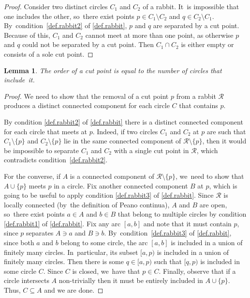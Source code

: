 \documentclass[JEP,XML,SOM,Unicode,NoFloatCountersInSection,published]{cedram}
\theoremstyle{plain}
\newtheorem{lemma}[theorem]{Lemma}
\theoremstyle{definition}
\theoremstyle{remark}
\newcommand{\R}{\mathcal{R}}
\begin{document}
\begin{proof}
Consider two distinct circles $C_1$ and $C_2$ of a rabbit. It~is impossible that one includes the other, so~there exist points $p \in C_1 \setminus C_2$ and $q \in C_2 \setminus C_1$. By~condition~\cref{def.rabbit2} of \cref{def.rabbit}, $p$ and $q$ are separated by a cut point.
Because of this, $C_1$ and $C_2$ cannot meet at more than one point, as otherwise $p$ and $q$ could not be separated by a cut point.
Then $C_1 \cap C_2$ is either empty or consists of a sole cut point.
\end{proof}

\begin{lemma}
\label{lem.cut.points.order}
The order of a cut point is equal to the number of circles that include~it.
\end{lemma}

\begin{proof}
We need to show that the removal of a cut point $p$ from a rabbit $\R$ produces a distinct connected component for each circle $C$ that contains $p$.

By condition \cref{def.rabbit2} of \cref{def.rabbit} there is a distinct connected component for each circle that meets at $p$.
Indeed, if two circles $C_1$ and $C_2$ at $p$ are such that $C_1 \setminus \{p\}$ and $C_2 \setminus \{p\}$ lie in the same connected component of $\R \setminus \{p\}$, then it would be impossible to separate $C_1$ and $C_2$ with a single cut point in $\R$, which contradicts condition~\cref{def.rabbit2}.

For the converse, if $A$ is a connected component of $\R \setminus \{p\}$, we~need to show that $A \cup \{p\}$ meets $p$ in a circle.
Fix another connected component $B$ at $p$, which is going to be useful to apply condition \cref{def.rabbit3} of \cref{def.rabbit}.
Since $\R$ is locally connected (by~the definition of Peano continua), $A$ and $B$ are open, so~there exist points $a \in A$ and $b \in B$ that belong to multiple circles by condition \cref{def.rabbit1} of \cref{def.rabbit}.
Fix any arc $[a,b]$ and note that it must contain $p$, since $p$ separates $A \ni a$ and $B \ni b$. By~condition~\cref{def.rabbit3} of \cref{def.rabbit}, since both $a$ and $b$ belong to some circle, the arc $[a,b]$ is included in a union of finitely many circles. In~particular, its subset $[a,p)$ is included in a union of finitely many circles.
Then there is some $q \in [a,p)$ such that $[q,p)$ is included in some circle $C$.
Since $C$ is closed, we~have that $p \in C$.
Finally, observe that if a circle intersects $A$ non-trivially then it must be entirely included in $A \cup \{p\}$.
Thus, $C \subseteq A$ and we are done.
\end{proof}
\end{document}
